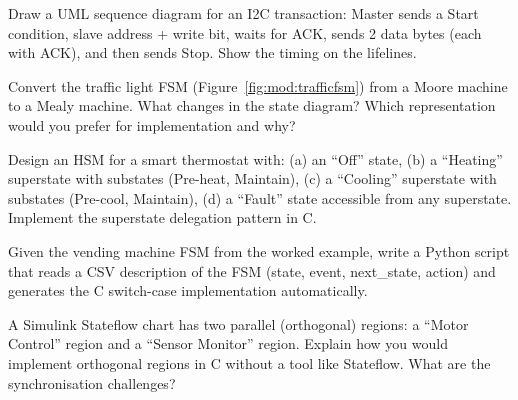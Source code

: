 \begin{exercise}
Draw a UML sequence diagram for an I2C transaction: Master sends a Start condition, slave address + write bit, waits for ACK, sends 2 data bytes (each with ACK), and then sends Stop. Show the timing on the lifelines.
\end{exercise}

\begin{exercise}
Convert the traffic light FSM (Figure~\ref{fig:mod:trafficfsm}) from a Moore machine to a Mealy machine. What changes in the state diagram? Which representation would you prefer for implementation and why?
\end{exercise}

\begin{exercise}
Design an HSM for a smart thermostat with: (a) an ``Off'' state, (b) a ``Heating'' superstate with substates (Pre-heat, Maintain), (c) a ``Cooling'' superstate with substates (Pre-cool, Maintain), (d) a ``Fault'' state accessible from any superstate. Implement the superstate delegation pattern in C.
\end{exercise}

\begin{exercise}
Given the vending machine FSM from the worked example, write a Python script that reads a CSV description of the FSM (state, event, next\_state, action) and generates the C switch-case implementation automatically.
\end{exercise}

\begin{exercise}[Stateflow to C]
A Simulink Stateflow chart has two parallel (orthogonal) regions: a ``Motor Control'' region and a ``Sensor Monitor'' region. Explain how you would implement orthogonal regions in C without a tool like Stateflow. What are the synchronisation challenges?
\end{exercise}
